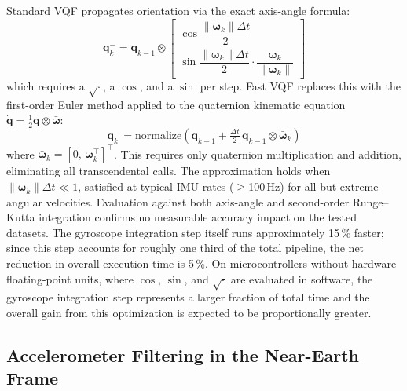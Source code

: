 \documentclass[conference]{IEEEtran}
\begin{document}
Standard VQF propagates orientation via the exact axis-angle formula:
\begin{equation}
    \mathbf{q}_k^- = \mathbf{q}_{k-1} \otimes
    \begin{bmatrix}
        \cos\!\dfrac{\|\boldsymbol{\omega}_k\|\Delta t}{2} \\[4pt]
        \sin\!\dfrac{\|\boldsymbol{\omega}_k\|\Delta t}{2}\cdot\dfrac{\boldsymbol{\omega}_k}{\|\boldsymbol{\omega}_k\|}
    \end{bmatrix}
    \label{eq:gyro_aa}
\end{equation}
which requires a $\sqrt{\cdot}$, a $\cos$, and a $\sin$ per step. Fast VQF replaces this with the first-order Euler method applied to the quaternion kinematic equation $\dot{\mathbf{q}} = \frac{1}{2}\mathbf{q}\otimes\bar{\boldsymbol{\omega}}$:
\begin{equation}
    \mathbf{q}_k^- = \mathrm{normalize}\!\left(\mathbf{q}_{k-1} + \tfrac{\Delta t}{2}\,\mathbf{q}_{k-1} \otimes \bar{\boldsymbol{\omega}}_k\right)
    \label{eq:gyro_euler}
\end{equation}
where $\bar{\boldsymbol{\omega}}_k = [0,\,\boldsymbol{\omega}_k^\top]^\top$. This requires only quaternion multiplication and addition, eliminating all transcendental calls. The approximation holds when $\|\boldsymbol{\omega}_k\|\Delta t \ll 1$, satisfied at typical IMU rates ($\geq$100\,Hz) for all but extreme angular velocities. Evaluation against both axis-angle and second-order Runge--Kutta integration confirms no measurable accuracy impact on the tested datasets. The gyroscope integration step itself runs approximately 15\,\% faster; since this step accounts for roughly one third of the total pipeline, the net reduction in overall execution time is 5\,\%. On microcontrollers without hardware floating-point units, where $\cos$, $\sin$, and $\sqrt{\cdot}$ are evaluated in software, the gyroscope integration step represents a larger fraction of total time and the overall gain from this optimization is expected to be proportionally greater.

\subsection{Accelerometer Filtering in the Near-Earth Frame}
\end{document}
